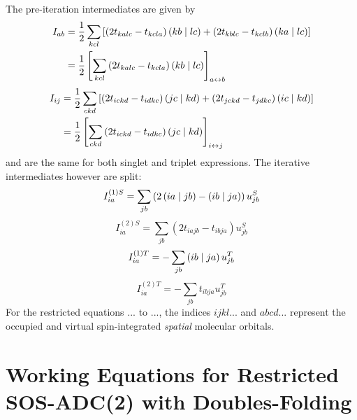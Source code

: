 \noindent The pre-iteration intermediates are given by
\begin{equation}
\begin{split}
I_{ab} &= \frac{1}{2} \sum_{kcl} \left[ \left( 2t_{kalc} - t_{kcla}\right) \left( kb \mid lc \right) + \left( 2t_{kblc} - t_{kclb} \right) \left( ka \mid lc \right) \right] \\
&= \frac{1}{2} \left[ \sum_{kcl} \left( 2t_{kalc} - t_{kcla}\right) \left( kb \mid lc \right) \right]_{a \leftrightarrow b}
\end{split}
\end{equation}
\begin{equation}
\begin{split}
I_{ij} &= \frac{1}{2} \sum_{ckd} \left[ \left( 2t_{ickd} - t_{idkc}\right) \left( jc \mid kd \right) + \left( 2t_{jckd} - t_{jdkc} \right) \left( ic \mid kd \right) \right] \\
&= \frac{1}{2} \left[ \sum_{ckd} \left( 2t_{ickd} - t_{idkc}\right) \left( jc \mid kd \right) \right]_{i \leftrightarrow j}
\end{split}
\end{equation}
\noindent and are the same for both singlet and triplet expressions. The iterative intermediates however are split:
\begin{equation}
I^{(1)S}_{ia} = \sum_{jb} \left( 2\left( ia \mid jb \right) - \left( ib \mid ja \right) \right) u_{jb}^S
\end{equation}
\begin{equation}
I^{(2)S}_{ia} = \sum_{jb} \left( 2t_{iajb} - t_{ibja}\right) u_{jb}^S
\end{equation}
\begin{equation}
I^{(1)T}_{ia} = - \sum_{jb} \left( ib \mid ja \right) u_{jb}^T
\end{equation}
\begin{equation}
I^{(2)T}_{ia} = - \sum_{jb} t_{ibja} u_{jb}^T
\end{equation}
\noindent For the restricted equations ... to ..., the indices $ijkl...$ and $abcd...$  represent the occupied and virtual spin-integrated \emph{spatial} molecular orbitals. 

\section{Working Equations for Restricted SOS-ADC(2) with Doubles-Folding}

